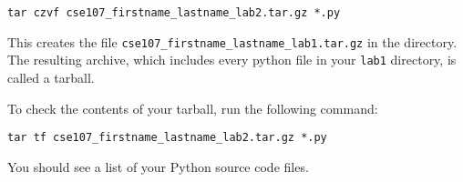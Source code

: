 \documentclass[12pt,hidelinks]{article}
\begin{document}
\begin{lstlisting}[style=bash]
tar czvf cse107_firstname_lastname_lab2.tar.gz *.py
\end{lstlisting}

This creates the file \texttt{cse107\_firstname\_lastname\_lab1.tar.gz} in the directory. The resulting archive, which includes every python file in your \texttt{lab1} directory, is called a tarball. 

To check the contents of your tarball, run the following command:

\begin{lstlisting}[style=bash]
tar tf cse107_firstname_lastname_lab2.tar.gz *.py
\end{lstlisting}

You should see a list of your Python source code files.
\end{document}
